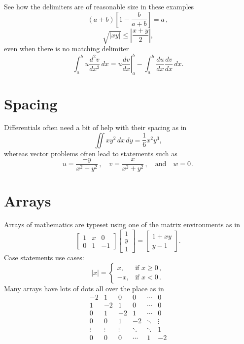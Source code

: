\documentclass[11pt,a4paper,oldfontcommands]{memoir}
\begin{document}
See how the delimiters are of reasonable size in these examples
\[
  \left(a+b\right)\left[1-\frac{b}{a+b}\right]=a\,,
\]
\[
  \sqrt{|xy|}\leq\left|\frac{x+y}{2}\right|,
\]
even when there is no matching delimiter
\[
  \int_a^bu\frac{d^2v}{dx^2}\,dx
  =\left.u\frac{dv}{dx}\right|_a^b
  -\int_a^b\frac{du}{dx}\frac{dv}{dx}\,dx.
\]






\section{Spacing}

Differentials often need a bit of help with their spacing as in
\[
  \iint xy^2\,dx\,dy 
  =\frac{1}{6}x^2y^3,
\]
whereas vector problems often lead to statements such as
\[
  u=\frac{-y}{x^2+y^2}\,,\quad
  v=\frac{x}{x^2+y^2}\,,\quad\text{and}\quad
  w=0\,.
\]







\section{Arrays}

Arrays of mathematics are typeset using one of the matrix environments as 
in
\[
  \begin{bmatrix}
    1 & x & 0 \\
    0 & 1 & -1
  \end{bmatrix}\begin{bmatrix}
    1  \\
    y  \\
    1
  \end{bmatrix}
  =\begin{bmatrix}
    1+xy  \\
    y-1
  \end{bmatrix}.
\]
Case statements use cases:
\[
  |x|=\begin{cases}
    x, & \text{if }x\geq 0\,,  \\
    -x, & \text{if }x< 0\,.
  \end{cases}
\]
Many arrays have lots of dots all over the place as in
\[
  \begin{matrix}
    -2 & 1 & 0 & 0 & \cdots & 0  \\
    1 & -2 & 1 & 0 & \cdots & 0  \\
    0 & 1 & -2 & 1 & \cdots & 0  \\
    0 & 0 & 1 & -2 & \ddots & \vdots \\
    \vdots & \vdots & \vdots & \ddots & \ddots & 1  \\
    0 & 0 & 0 & \cdots & 1 & -2
  \end{matrix}
\]
\end{document}
